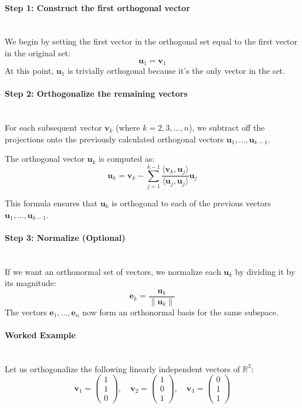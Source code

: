 \documentclass[]{article}
\begin{document}
	\paragraph{Step 1: Construct the first orthogonal vector}
	\noindent\\
	We begin by setting the first vector in the orthogonal set equal to the first vector in the original set:
	$$ \mathbf{u}_1 = \mathbf{v}_1 $$
	At this point, $\mathbf{u}_1$ is trivially orthogonal because it's the only vector in the set.
	
	\paragraph{Step 2: Orthogonalize the remaining vectors}
	\noindent\\
	For each subsequent vector $\mathbf{v}_k$ (where $k = 2, 3, \dots, n$), we subtract off the projections onto the previously calculated orthogonal vectors $\mathbf{u}_1, \dots, \mathbf{u}_{k-1}$.
	
	The orthogonal vector $\mathbf{u}_k$ is computed as:
	$$
	\mathbf{u}_k = \mathbf{v}_k - \sum_{j=1}^{k-1} \frac{\langle \mathbf{v}_k, \mathbf{u}_j \rangle}{\langle \mathbf{u}_j, \mathbf{u}_j \rangle} \mathbf{u}_j
	$$
	
	This formula ensures that $\mathbf{u}_k$ is orthogonal to each of the previous vectors $\mathbf{u}_1, \dots, \mathbf{u}_{k-1}$.
	
	\paragraph{Step 3: Normalize (Optional)}
	\noindent\\
	If we want an orthonormal set of vectors, we normalize each $\mathbf{u}_k$ by dividing it by its magnitude:
	$$
	\mathbf{e}_k = \frac{\mathbf{u}_k}{\|\mathbf{u}_k\|}
	$$
	The vectors $\mathbf{e}_1, \dots, \mathbf{e}_n$ now form an orthonormal basis for the same subspace.

	\paragraph{Worked Example}
	\noindent\\
	Let us orthogonalize the following linearly independent vectors of $\mathbb{R}^3$:
	$$
	\mathbf{v}_1 = \begin{pmatrix} 1 \\ 1 \\ 0 \end{pmatrix}, \quad
	\mathbf{v}_2 = \begin{pmatrix} 1 \\ 0 \\ 1 \end{pmatrix}, \quad
	\mathbf{v}_3 = \begin{pmatrix} 0 \\ 1 \\ 1 \end{pmatrix}
	$$
\end{document}
